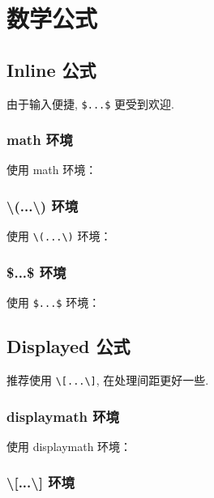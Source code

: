 \chapter{数学公式}

\section{Inline 公式}

由于输入便捷, \verb|$...$| 更受到欢迎.

\subsection{{\ttfamily math} 环境}

使用 {\ttfamily math} 环境：


\subsection{{\ttfamily \textbackslash(...\textbackslash)} 环境}

使用 \verb|\(...\)| 环境：


\subsection{{\ttfamily \$...\$} 环境}

使用 \verb|$...$| 环境：


\section{Displayed 公式}

推荐使用 \verb|\[...\]|, 在处理间距更好一些.

\subsection{{\ttfamily displaymath} 环境}

使用 {\ttfamily displaymath} 环境：


\subsection{{\ttfamily \textbackslash[...\textbackslash]} 环境}

